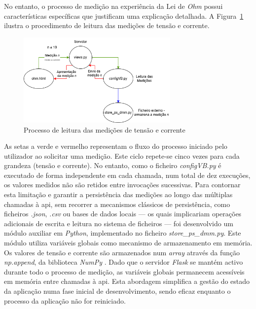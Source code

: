 No entanto, o processo de medição na experiência da Lei de \textit{Ohm} possui características específicas que justificam uma explicação detalhada. A Figura~\ref{fig:processoleituraUI} ilustra o procedimento de leitura das medições de tensão e corrente.

\begin{figure}[hbtp]
	\centering
	\includegraphics[width=0.7\textwidth]{figures/medicoes_OHM.drawio.png}
	\caption{Processo de leitura das medições de tensão e corrente}
	\label{fig:processoleituraUI}
\end{figure}

As setas a verde e vermelho representam o fluxo do processo iniciado pelo utilizador ao solicitar uma medição. Este ciclo repete-se cinco vezes para cada grandeza (tensão e corrente). No entanto, como o ficheiro \textit{configVB.py} é executado de forma independente em cada chamada, num total de dez execuções, os valores medidos não são retidos entre invocações sucessivas. Para contornar esta limitação e garantir a persistência das medições ao longo das múltiplas chamadas à \acrshort{api}, sem recorrer a mecanismos clássicos de persistência, como ficheiros \textit{.json}, \textit{.csv} ou bases de dados locais — os quais implicariam operações adicionais de escrita e leitura no sistema de ficheiros — foi desenvolvido um módulo auxiliar em \textit{Python}, implementado no ficheiro \textit{store\_ps\_dmm.py}. Este módulo utiliza variáveis globais como mecanismo de armazenamento em memória. Os valores de tensão e corrente são armazenados num \textit{array} através da função \textit{np.append}, da biblioteca \textit{NumPy} \cite{NumPy}. Dado que o servidor \textit{Flask} se mantém activo durante todo o processo de medição, as variáveis globais permanecem acessíveis em memória entre chamadas à \acrshort{api}. Esta abordagem simplifica a gestão do estado da aplicação numa fase inicial de desenvolvimento, sendo eficaz enquanto o processo da aplicação não for reiniciado.

